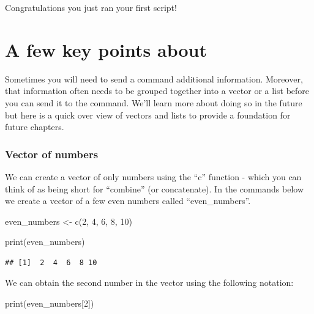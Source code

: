 \documentclass[
]{krantz}
\makeatletter
\newenvironment{Shaded}{\begin{snugshade}}{\end{snugshade}}
\newcommand{\DecValTok}[1]{\textcolor[rgb]{0.06,0.06,0.06}{#1}}
\newcommand{\FunctionTok}[1]{\textcolor[rgb]{0,0,0}{#1}}
\newcommand{\NormalTok}[1]{#1}
\newcommand{\OtherTok}[1]{\textcolor[rgb]{0.37,0.37,0.37}{#1}}
\newenvironment{kframe}{%
\medskip{}
\setlength{\fboxsep}{.8em}
 \def\at@end@of@kframe{}%
 \ifinner\ifhmode%
  \def\at@end@of@kframe{\end{minipage}}%
  \begin{minipage}{\columnwidth}%
 \fi\fi%
 \def\FrameCommand##1{\hskip\@totalleftmargin \hskip-\fboxsep
 \colorbox{shadecolor}{##1}\hskip-\fboxsep
     \hskip-\linewidth \hskip-\@totalleftmargin \hskip\columnwidth}%
 \MakeFramed {\advance\hsize-\width
   \@totalleftmargin\z@ \linewidth\hsize
   \@setminipage}}%
 {\par\unskip\endMakeFramed%
 \at@end@of@kframe}
\renewenvironment{Shaded}{\begin{kframe}}{\end{kframe}}
\makeatother
\begin{document}
Congratulations you just ran your first script!

\hypertarget{a-few-key-points-about}{%
\section{A few key points about}\label{a-few-key-points-about}}

Sometimes you will need to send a command additional information. Moreover, that information often needs to be grouped together into a vector or a list before you can send it to the command. We'll learn more about doing so in the future but here is a quick over view of vectors and lists to provide a foundation for future chapters.

\hypertarget{vector-of-numbers}{%
\subsubsection{Vector of numbers}\label{vector-of-numbers}}

We can create a vector of only numbers using the ``c'' function - which you can think of as being short for ``combine'' (or concatenate). In the commands below we create a vector of a few even numbers called ``even\_numbers''.

\begin{Shaded}
\begin{Highlighting}[]
\NormalTok{even\_numbers }\OtherTok{\textless{}{-}} \FunctionTok{c}\NormalTok{(}\DecValTok{2}\NormalTok{, }\DecValTok{4}\NormalTok{, }\DecValTok{6}\NormalTok{, }\DecValTok{8}\NormalTok{, }\DecValTok{10}\NormalTok{)}
\end{Highlighting}
\end{Shaded}

\begin{Shaded}
\begin{Highlighting}[]
\FunctionTok{print}\NormalTok{(even\_numbers)}
\end{Highlighting}
\end{Shaded}

\begin{verbatim}
## [1]  2  4  6  8 10
\end{verbatim}

We can obtain the second number in the vector using the following notation:

\begin{Shaded}
\begin{Highlighting}[]
\FunctionTok{print}\NormalTok{(even\_numbers[}\DecValTok{2}\NormalTok{])}
\end{Highlighting}
\end{Shaded}
\end{document}
